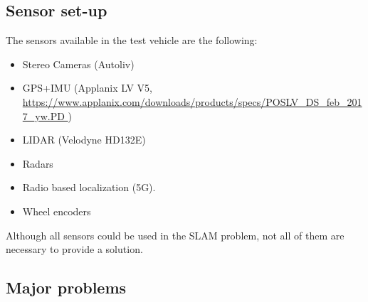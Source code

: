 \subsection{Sensor set-up}\label{sec:sensor-setup}
The sensors available in the test vehicle are the following:
\begin{itemize}
\item Stereo Cameras (Autoliv)
\item GPS+IMU (Applanix LV V5,
  \url{https://www.applanix.com/downloads/products/specs/POSLV_DS_feb_2017_yw.PD
  })
\item  \gls{LIDAR} (Velodyne HD132E)
\item  Radars
\item  Radio based localization (5G).
\item  Wheel encoders
\end{itemize}
Although all sensors could be used in the \gls{SLAM} problem, not all of them
are necessary to provide a solution.

\subsection{Major problems}

